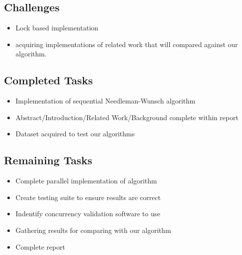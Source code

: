 \documentclass[letterpaper, 10 pt, conference]{IEEEconf}
\begin{document}
\subsection{Challenges}
\begin{itemize}
	\item
	Lock based implementation
	\item 
	acquiring implementations of related work that will compared against our algorithm. 
\end{itemize}

\subsection{Completed Tasks}
\begin{itemize}
	\item
	Implementation of sequential Needleman-Wunsch algorithm
	\item
	Abstract/Introduction/Related Work/Background complete within report
	\item
	Dataset acquired to test our algorithms
\end{itemize}


\subsection{Remaining Tasks}
\begin{itemize}
	\item
	Complete parallel implementation of algorithm
	\item
	Create testing suite to ensure results are correct
	\item
	Indentify concurrency validation software to use
	\item
	Gathering results for comparing with our algorithm
	\item
	Complete report
\end{itemize}




\end{document}
